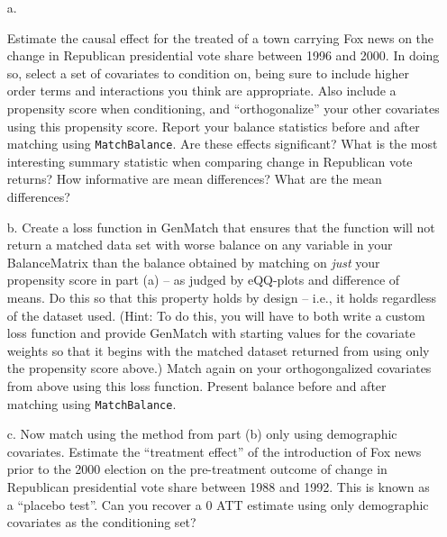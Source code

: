 \documentclass{article}
\begin{document}
\begin{itemize}
\item[a.] 

  Estimate the causal effect for the treated of a town carrying Fox
  news on the change in Republican presidential vote share between
  1996 and 2000.  In doing so, select a set of covariates to condition
  on, being sure to include higher order terms and interactions you
  think are appropriate.  Also include a propensity score when
  conditioning, and ``orthogonalize'' your other covariates using this
  propensity score. Report your balance statistics before and after
  matching using \texttt{MatchBalance}.  Are these effects
  significant?  What is the most interesting summary statistic when
  comparing change in Republican vote returns? How informative are
  mean differences? What are the mean differences?

\item[b.] Create a loss function in GenMatch that ensures that the
  function will not return a matched data set with worse balance on
  any variable in your BalanceMatrix than the balance obtained by
  matching on {\em just} your propensity score in part (a) -- as
  judged by eQQ-plots and difference of means. Do this so that this
  property holds by design -- i.e., it holds regardless of the dataset
  used. (Hint: To do this, you will have to both write a custom loss
  function and provide GenMatch with starting values for the covariate
  weights so that it begins with the matched dataset returned from
  using only the propensity score above.)  Match again on your
  orthogongalized covariates from above using this loss function.
  Present balance before and after matching using
  \texttt{MatchBalance}.  %

\item[c.] Now match using the method from part (b) only using
  demographic covariates.  Estimate the ``treatment effect'' of the
  introduction of Fox news prior to the 2000 election on the pre-treatment
  outcome of change in Republican presidential vote share between
  1988 and 1992. This is known as a ``placebo test''. Can you recover a
  0 ATT estimate using only demographic covariates as the conditioning
  set?



\end{itemize}
\end{document}
